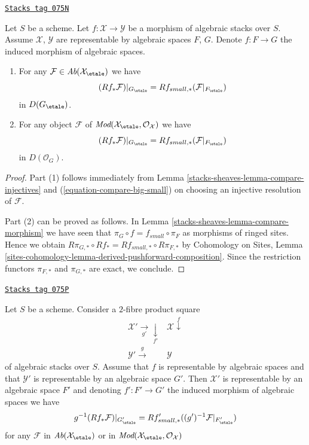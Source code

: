 \begin{lemma}
\label{stacks-sheaves-lemma-compare-morphism-cohomology}
\href{https://stacks.math.columbia.edu/tag/075N}{\texttt{Stacks tag 075N}}

Let $S$ be a scheme. Let $f : \mathcal{X} \to \mathcal{Y}$ be a morphism
of algebraic stacks over $S$. Assume $\mathcal{X}$, $\mathcal{Y}$ are
representable by algebraic spaces $F$, $G$. Denote $f : F \to G$ the
induced morphism of algebraic spaces.
\begin{enumerate}
\item For any $\mathcal{F} \in \textit{Ab}(\mathcal{X}_\etale)$
we have
$$
(Rf_*\mathcal{F})|_{G_\etale} =
Rf_{small, *}(\mathcal{F}|_{F_\etale})
$$
in $D(G_\etale)$.
\item For any object $\mathcal{F}$ of
$\textit{Mod}(\mathcal{X}_\etale, \mathcal{O}_\mathcal{X})$
we have
$$
(Rf_*\mathcal{F})|_{G_\etale} =
Rf_{small, *}(\mathcal{F}|_{F_\etale})
$$
in $D(\mathcal{O}_G)$.
\end{enumerate}
\end{lemma}

\begin{proof}
Part (1) follows immediately from
Lemma \ref{stacks-sheaves-lemma-compare-injectives}
and (\ref{equation-compare-big-small})
on choosing an injective resolution of $\mathcal{F}$.

\medskip\noindent
Part (2) can be proved as follows. In Lemma \ref{stacks-sheaves-lemma-compare-morphism}
we have seen that $\pi_G \circ f = f_{small} \circ \pi_F$ as morphisms
of ringed sites. Hence we obtain
$R\pi_{G, *} \circ Rf_* = Rf_{small, *} \circ R\pi_{F, *}$
by Cohomology on Sites, Lemma
\ref{sites-cohomology-lemma-derived-pushforward-composition}.
Since the restriction functors $\pi_{F, *}$ and $\pi_{G, *}$
are exact, we conclude.
\end{proof}

\begin{lemma}
\label{stacks-sheaves-lemma-compare-representable-morphism-cohomology}
\href{https://stacks.math.columbia.edu/tag/075P}{\texttt{Stacks tag 075P}}

Let $S$ be a scheme. Consider a $2$-fibre product square
$$
\begin{array}{cc}\mathcal{X}' \underset{g'}{\longrightarrow}\underset{f'}{\downarrow} & \mathcal{X} \overset{f}{\downarrow} \\ \mathcal{Y}' \overset{g}{\longrightarrow} & \mathcal{Y}\end{array}
$$
of algebraic stacks over $S$. Assume that $f$ is representable by algebraic
spaces and that $\mathcal{Y}'$ is representable by an algebraic space $G'$.
Then $\mathcal{X}'$ is representable by an algebraic space $F'$ and
denoting $f' : F' \to G'$ the induced morphism of algebraic spaces
we have
$$
g^{-1}(Rf_*\mathcal{F})|_{G'_\etale} =
Rf'_{small, *}((g')^{-1}\mathcal{F}|_{F'_\etale})
$$
for any $\mathcal{F}$ in $\textit{Ab}(\mathcal{X}_\etale)$
or in
$\textit{Mod}(\mathcal{X}_\etale, \mathcal{O}_\mathcal{X})$
\end{lemma}

